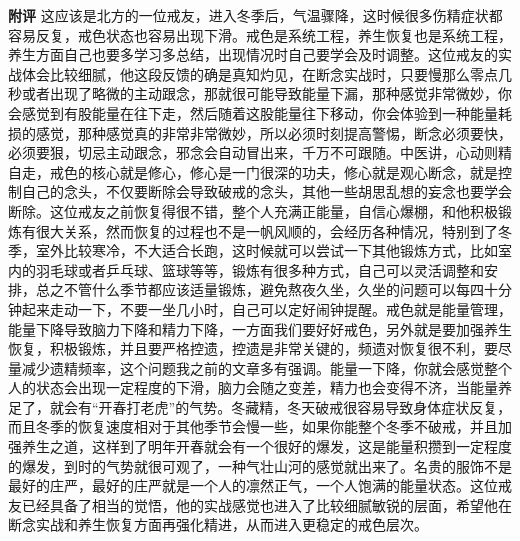 \begin{case}
    \textbf{附评} 这应该是北方的一位戒友，进入冬季后，气温骤降，这时候很多伤精症状都容易反复，戒色状态也容易出现下滑。戒色是系统工程，养生恢复也是系统工程，养生方面自己也要多学习多总结，出现情况时自己要学会及时调整。这位戒友的实战体会比较细腻，他这段反馈的确是真知灼见，在断念实战时，只要慢那么零点几秒或者出现了略微的主动跟念，那就很可能导致能量下漏，那种感觉非常微妙，你会感觉到有股能量在往下走，然后随着这股能量往下移动，你会体验到一种能量耗损的感觉，那种感觉真的非常非常微妙，所以必须时刻提高警惕，断念必须要快，必须要狠，切忌主动跟念，邪念会自动冒出来，千万不可跟随。中医讲，心动则精自走，戒色的核心就是修心，修心是一门很深的功夫，修心就是观心断念，就是控制自己的念头，不仅要断除会导致破戒的念头，其他一些胡思乱想的妄念也要学会断除。这位戒友之前恢复得很不错，整个人充满正能量，自信心爆棚，和他积极锻炼有很大关系，然而恢复的过程也不是一帆风顺的，会经历各种情况，特别到了冬季，室外比较寒冷，不大适合长跑，这时候就可以尝试一下其他锻炼方式，比如室内的羽毛球或者乒乓球、篮球等等，锻炼有很多种方式，自己可以灵活调整和安排，总之不管什么季节都应该适量锻炼，避免熬夜久坐，久坐的问题可以每四十分钟起来走动一下，不要一坐几小时，自己可以定好闹钟提醒。戒色就是能量管理，能量下降导致脑力下降和精力下降，一方面我们要好好戒色，另外就是要加强养生恢复，积极锻炼，并且要严格控遗，控遗是非常关键的，频遗对恢复很不利，要尽量减少遗精频率，这个问题我之前的文章多有强调。能量一下降，你就会感觉整个人的状态会出现一定程度的下滑，脑力会随之变差，精力也会变得不济，当能量养足了，就会有“开春打老虎”的气势。冬藏精，冬天破戒很容易导致身体症状反复，而且冬季的恢复速度相对于其他季节会慢一些，如果你能整个冬季不破戒，并且加强养生之道，这样到了明年开春就会有一个很好的爆发，这是能量积攒到一定程度的爆发，到时的气势就很可观了，一种气壮山河的感觉就出来了。名贵的服饰不是最好的庄严，最好的庄严就是一个人的凛然正气，一个人饱满的能量状态。这位戒友已经具备了相当的觉悟，他的实战感觉也进入了比较细腻敏锐的层面，希望他在断念实战和养生恢复方面再强化精进，从而进入更稳定的戒色层次。
\end{case}

